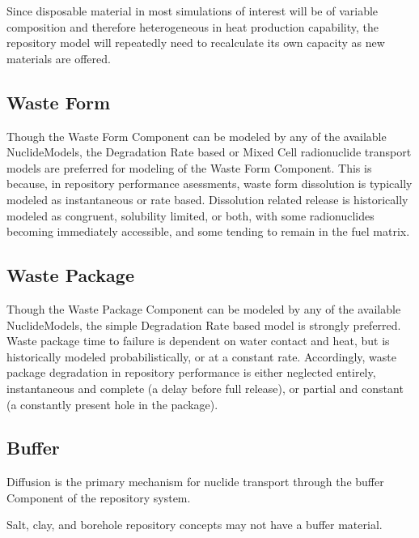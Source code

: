 Since disposable material in most simulations of interest will be of variable 
composition and therefore heterogeneous in heat production capability, the 
repository model will repeatedly need to recalculate its own capacity as 
new materials are offered.

\subsection{Waste Form}
Though the Waste Form Component can be modeled by any of the available 
NuclideModels, the Degradation Rate based or Mixed Cell radionuclide transport 
models are preferred for modeling of the Waste Form Component.  This is 
because, in repository performance asessments, waste form dissolution is 
typically modeled as instantaneous or rate based. Dissolution related release 
is historically modeled as congruent, solubility limited, or both, with some 
radionuclides becoming immediately accessible, and some tending to remain in 
the fuel matrix. 

\subsection{Waste Package}
Though the Waste Package Component can be modeled by any of the available 
NuclideModels, the simple Degradation Rate based model is strongly preferred.
Waste package time to failure is dependent on water contact and heat, 
but is historically modeled probabilistically, or at a constant rate.
Accordingly, waste package degradation in repository performance is either 
neglected entirely, instantaneous and complete (a delay before full release), 
or partial and constant (a constantly present hole in the package). 

\subsection{Buffer}
Diffusion is the primary mechanism for nuclide transport through the 
buffer Component of the repository system.  

Salt, clay, and borehole repository concepts may not have a buffer 
material.

